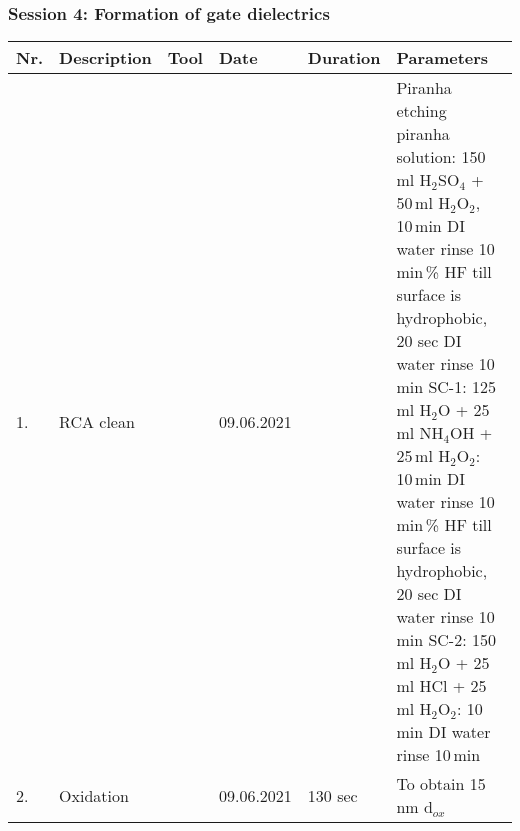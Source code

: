 \vspace{-0.1cm}
\subsubsection*{Session 4: Formation of gate dielectrics}     
\vspace{-0.5cm}   
\begin{table}[H]
\footnotesize
\begin{tabular}{| p{0.4cm}| p{4.0cm}| p{3.0cm}|p{2.0cm}| p{2.0cm}|p{13.5cm}|}
\hline
\textbf{Nr.}&\textbf{Description} &\textbf{Tool}& \textbf{Date}  &\textbf{Duration} & \textbf{Parameters}\\ \hline\hline

1. &RCA clean&  &09.06.2021 & & Piranha etching\newline 
piranha solution: 150\,ml H$_\text{2}$SO$_\text{4}$ + 50\,ml H$_\text{2}$O$_\text{2}$, 10\,min\newline
DI water rinse 10\,min\newline
1\,\% HF till surface is hydrophobic, 20 sec\newline
DI water rinse 10\,min\newline
SC-1: 125\,ml H$_\text{2}$O + 25\,ml NH$_\text{4}$OH + 25\,ml H$_\text{2}$O$_\text{2}$: 10\,min \newline
DI water rinse 10\,min\newline
1\,\% HF till surface is hydrophobic, 20 sec\newline
DI water rinse 10\,min\newline
SC-2: 150\,ml H$_\text{2}$O + 25\,ml HCl + 25\,ml H$_\text{2}$O$_\text{2}$: 10\,min\newline
DI water rinse 10\,min
\\\hline

2. & Oxidation & &  09.06.2021&    130 sec & To obtain 15 nm d$_{ox}$\\\hline
\end{tabular}
\end{table} 